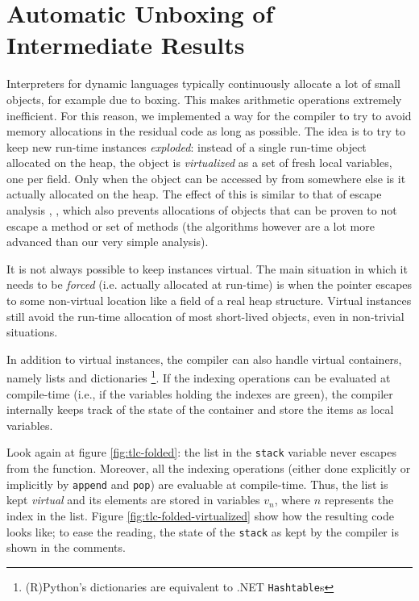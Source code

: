 \section{Automatic Unboxing of Intermediate Results}
\label{sec:virtuals}

Interpreters for dynamic languages typically continuously allocate a lot of small
objects, for example due to boxing. This makes arithmetic operations extremely
inefficient. For this reason, we
implemented a way for the compiler to try to avoid memory allocations in the
residual code as long as possible. The idea is to try to keep new
run-time instances \emph{exploded}: instead of a single run-time object allocated on
the heap, the object is \emph{virtualized} as a set
of fresh local variables, one per field. Only when the object can be accessed by from
somewhere else is it actually allocated on the heap. The effect of this is similar to that of
escape analysis \cite{Blanchet99escapeanalysis}, \cite{Choi99escapeanalysis},
which also prevents allocations of objects that can be proven to not escape a
method or set of methods (the algorithms however are a lot more advanced than
our very simple analysis).

It is not always possible to keep instances virtual.  The main
situation in which it needs to be \emph{forced} (i.e. actually allocated at
run-time) is when the pointer escapes to some non-virtual location like
a field of a real heap structure.  Virtual instances still avoid the run-time
 allocation of most short-lived objects, even in non-trivial situations.  

In addition to virtual instances, the compiler can also handle virtual
containers, namely lists and dictionaries \footnote{(R)Python's dictionaries
  are equivalent to .NET \lstinline{Hashtable}s}.  If the indexing operations
can be evaluated at compile-time (i.e., if the variables holding the indexes
are green), the compiler internally keeps track of the state of the container
and store the items as local variables.

Look again at figure \ref{fig:tlc-folded}: the list in the \lstinline{stack}
variable never escapes from the function.  Moreover, all the indexing
operations (either done explicitly or implicitly by \lstinline{append} and
\lstinline{pop}) are evaluable at compile-time.  Thus, the list is kept
\emph{virtual} and its elements are stored in variables $v_n$, where $n$
represents the index in the list.  Figure \ref{fig:tlc-folded-virtualized}
show how the resulting code looks like; to ease the reading, the state of the
\lstinline{stack} as kept by the compiler is shown in the comments.

